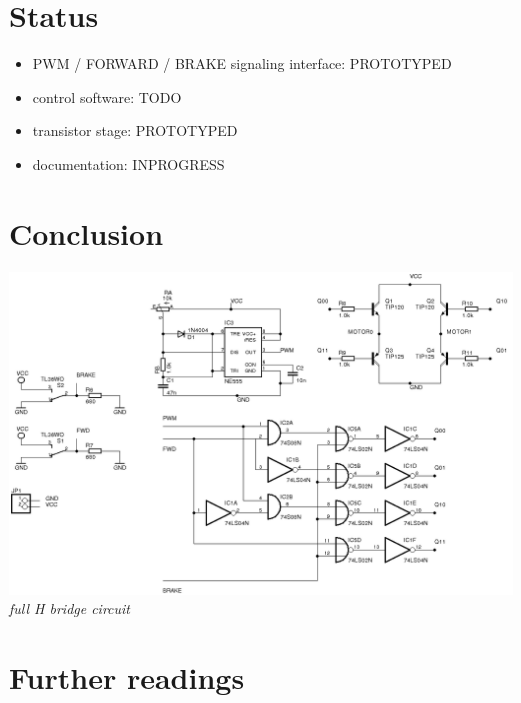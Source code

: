 \documentclass[12pt]{article}
\begin{document}
\newpage
\section{Status}
\begin{itemize}
  \item PWM / FORWARD / BRAKE signaling interface: PROTOTYPED
  \item control software: TODO
  \item transistor stage: PROTOTYPED
  \item documentation: INPROGRESS
\end{itemize}


\newpage
\section{Conclusion}
\begin{center}
  \includegraphics[keepaspectratio=true, scale=0.86]{../pics/h_full.png}
  \\
  \smallskip
  \tiny{\textit{full H bridge circuit}}
\end{center}


\newpage
\section{Further readings}
\end{document}
